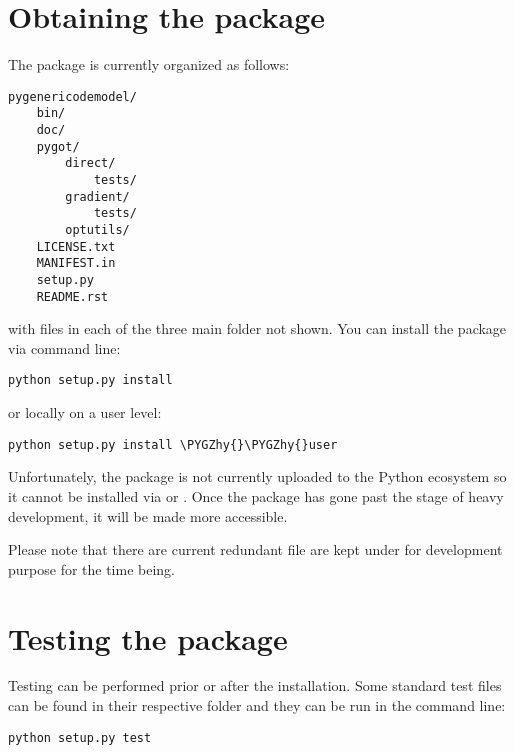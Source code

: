 \documentclass[letterpaper,10pt,english]{sphinxmanual}
\def\PYGZhy{\char`\-}
\begin{document}
\section{Obtaining the package}
\label{getting_started:obtaining-the-package}\label{getting_started:installing-docdir}
The package is currently organized as follows:

\begin{Verbatim}[commandchars=\\\{\}]
pygenericodemodel/
    bin/
    doc/
    pygot/
        direct/
            tests/
        gradient/
            tests/
        optutils/
    LICENSE.txt
    MANIFEST.in
    setup.py
    README.rst
\end{Verbatim}

with files in each of the three main folder not shown.  You can install the package via command line:

\begin{Verbatim}[commandchars=\\\{\}]
python setup.py install
\end{Verbatim}

or locally on a user level:

\begin{Verbatim}[commandchars=\\\{\}]
python setup.py install \PYGZhy{}\PYGZhy{}user
\end{Verbatim}

Unfortunately, the package is not currently uploaded to the Python ecosystem so it cannot be installed via  or .  Once the package has gone past the stage of heavy development, it will be made more accessible.

Please note that there are current redundant file are kept under  for development purpose for the time being.


\section{Testing the package}
\label{getting_started:id2}\label{getting_started:testing-the-package}
Testing can be performed prior or after the installation.  Some standard test files can be found in their respective folder and they can be run in the command line:

\begin{Verbatim}[commandchars=\\\{\}]
python setup.py test
\end{Verbatim}
\end{document}
